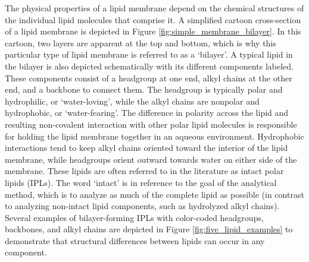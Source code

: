 The physical properties of a lipid membrane depend on the chemical structures of the individual lipid molecules that comprise it. A simplified cartoon cross-section of a lipid membrane is depicted in Figure \ref{fig:simple_membrane_bilayer}.
In this cartoon, two layers are apparent at the top and bottom, which is why this particular type of lipid membrane is referred to as a `bilayer'. A typical lipid in the bilayer is also depicted schematically with its different components labeled. These components consist of a headgroup at one end, alkyl chains at the other end, and a backbone to connect them. The headgroup is typically polar and hydrophilic, or `water-loving', while the alkyl chains are nonpolar and hydrophobic, or `water-fearing'. The difference in polarity across the lipid and resulting non-covalent interaction with other polar lipid molecules is responsible for holding the lipid membrane together in an aqueous environment. Hydrophobic interactions tend to keep alkyl chains oriented toward the interior of the lipid membrane, while headgroups orient outward towards water on either side of the membrane. These lipids are often referred to in the literature as intact polar lipids (IPLs). The word `intact' is in reference to the goal of the analytical method, which is to analyze as much of the complete lipid as possible (in contrast to analyzing non-intact lipid components, such as hydrolyzed alkyl chains). Several examples of bilayer-forming IPLs with color-coded headgroups, backbones, and alkyl chains are depicted in Figure \ref{fig:five_lipid_examples} to demonstrate that structural differences between lipids can occur in any component.
